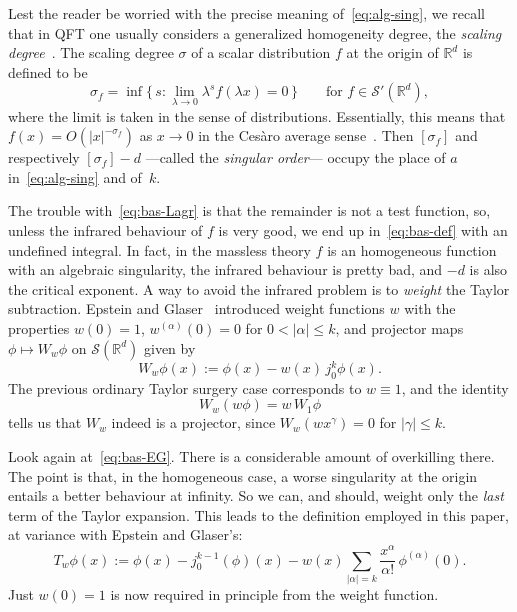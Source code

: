 \documentclass[a4paper,12pt]{article}
\renewcommand{\a}{\alpha}          %
\newcommand{\ga}{\gamma}           %
\newcommand{\la}{\lambda}          %
\newcommand{\R}{\mathbb{R}}        %
\newcommand{\set}[1]{\{\,#1\,\}}   %
\renewcommand{\SS}{\mathcal{S}}    %
\newcommand{\7}{\dagger}           %
\theoremstyle{plain}
\theoremstyle{definition}
\begin{document}
Lest the reader be worried with the precise meaning
of~\eqref{eq:alg-sing}, we recall that in QFT one usually considers a
generalized homogeneity degree, the \textit{scaling degree}~\cite{OS}.
The scaling degree $\sigma$ of a scalar distribution $f$ at the origin
of $\R^d$ is defined to be
$$
\sigma_f = \inf \set{s : \lim_{\la\to 0} \la^s f(\la x) = 0}
\qquad\mbox{for } f\in \SS'(\R^d),
$$
where the limit is taken in the sense of distributions. Essentially,
this means that $f(x) = O(|x|^{-\sigma_f})$ as $x \to 0$ in the
Ces\`aro average sense~\cite{Ricardo}. Then $[\sigma_f]$ and
respectively $[\sigma_f] - d$ ---called the \textit{singular order}---
occupy the place of $a$ in~\eqref{eq:alg-sing} and of~$k$.

The trouble with~\eqref{eq:bas-Lagr} is that the remainder is not a
test function, so, unless the infrared behaviour of $f$ is very good,
we end up in~\eqref{eq:bas-def} with an undefined integral. In fact,
in the massless theory $f$ is an homogeneous function with an
algebraic singularity, the infrared behaviour is pretty bad, and $-d$
is also the critical exponent. A way to avoid the infrared problem is
to \textit{weight} the Taylor subtraction. Epstein and
Glaser~\cite{EG} introduced weight functions $w$ with the properties
$w(0) = 1$, $w^{(\a)}(0) = 0$ for $0 < |\a| \leq k$, and projector
maps $\phi \mapsto W_w\phi$ on $\SS(\R^d)$ given by
\begin{equation}
W_w\phi(x) := \phi(x) - w(x)\, j^k_0\phi(x).
\label{eq:bas-EG}
\end{equation}
The previous ordinary Taylor surgery case corresponds to $w \equiv 1$,
and the identity
$$
W_w(w\phi) = w\, W_1\phi
$$
tells us that $W_w$ indeed is a projector, since $W_w(wx^\ga) = 0$ for
$|\ga| \leq k$.

\smallskip

Look again at~\eqref{eq:bas-EG}. There is a considerable amount of
overkilling there. The point is that, in the homogeneous case, a worse
singularity at the origin entails a better behaviour at infinity. So
we can, and should, weight only the \textit{last} term of the Taylor
expansion. This leads to the definition employed in this paper, at
variance with Epstein and Glaser's:
\begin{equation}
T_w\phi(x) :=  \phi(x) - j^{k-1}_0(\phi)(x)
  - w(x) \sum_{|\a|=k} \frac{x^\a}{\a!} \,\phi^{(\a)}(0).
\label{eq:imp-EG}
\end{equation}
Just $w(0) = 1$ is now required in principle from the weight function.
\end{document}
